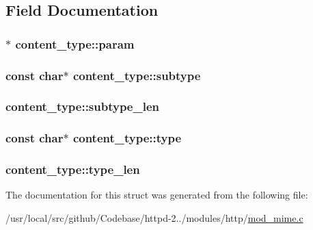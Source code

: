 \subsection{Field Documentation}
\subsubsection[{\texorpdfstring{param}{param}}]{$\ast$ content\+\_\+type\+::param}\hypertarget{structcontent__type_a949b9a296f4572aa6f97a54b9b5770a1}{}\label{structcontent__type_a949b9a296f4572aa6f97a54b9b5770a1}
\subsubsection[{\texorpdfstring{subtype}{subtype}}]{\setlength{\rightskip}{0pt plus 5cm}const char$\ast$ content\+\_\+type\+::subtype}\hypertarget{structcontent__type_a2c5fa0b72d7aca1db3ac831182908f59}{}\label{structcontent__type_a2c5fa0b72d7aca1db3ac831182908f59}
\subsubsection[{\texorpdfstring{subtype\+\_\+len}{subtype_len}}]{ content\+\_\+type\+::subtype\+\_\+len}\hypertarget{structcontent__type_ae4169ff6830eb7736bc8d9af3d277e26}{}\label{structcontent__type_ae4169ff6830eb7736bc8d9af3d277e26}
\subsubsection[{\texorpdfstring{type}{type}}]{\setlength{\rightskip}{0pt plus 5cm}const char$\ast$ content\+\_\+type\+::type}\hypertarget{structcontent__type_a738b2fb8e2906be2ccb198f0e0cbc552}{}\label{structcontent__type_a738b2fb8e2906be2ccb198f0e0cbc552}
\subsubsection[{\texorpdfstring{type\+\_\+len}{type_len}}]{ content\+\_\+type\+::type\+\_\+len}\hypertarget{structcontent__type_ae68ee0d2e0cc359c21a52c388d2d477d}{}\label{structcontent__type_ae68ee0d2e0cc359c21a52c388d2d477d}


The documentation for this struct was generated from the following file\+:\begin{DoxyCompactItemize}
\item 
/usr/local/src/github/\+Codebase/httpd-\/2../modules/http/\hyperlink{mod__mime_8c}{mod\+\_\+mime.\+c}\end{DoxyCompactItemize}
